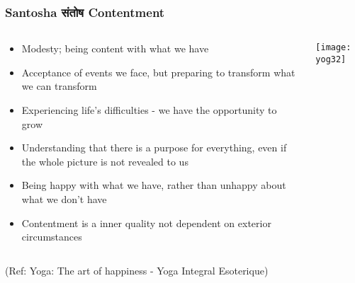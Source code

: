 \begin{frame}[fragile]\frametitle{Santosha संतोष  Contentment}
   \begin{columns}
    \begin{column}[t]{0.7\linewidth}
	
	\begin{itemize}
	\item Modesty; being content with what we have
	\item Acceptance of events we face, but preparing to transform what we can transform
	\item Experiencing life’s difficulties - we have the opportunity to grow 
	\item Understanding that there is a purpose for everything, even if the whole picture is not revealed to us 
	\item Being happy with what we have, rather than unhappy about what we don't have
	\item Contentment is a inner quality not dependent on exterior circumstances 

	\end{itemize}
	    \end{column}
    \begin{column}[t]{0.3\linewidth}
\begin{center}
\texttt{[image: yog32]}

\end{center}
    \end{column}
  \end{columns}
  
  \tiny{(Ref: Yoga: The art of happiness - Yoga Integral Esoterique)}

\end{frame}


